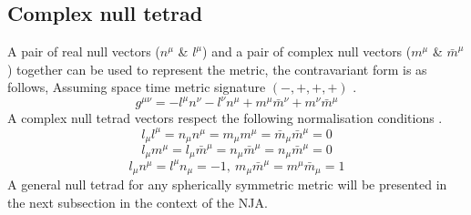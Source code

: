 \documentclass[12pt]{iopart}
\begin{document}
\subsection{Complex null tetrad}
A pair of real null vectors ($n^{\mu}$ \& $l^{\mu}$) and a pair of complex null vectors ($m^{\mu}$ \& $\bar{m}^{\mu}$) together can be used to represent the metric, the contravariant form is as follows, Assuming space time metric signature $(-,+,+,+)$ \cite{dInverno:1992gxs}. 
\begin{equation}
g^{\mu \nu}=-l^{\mu}n^{\nu}-l^{\nu}n^{\mu}+m^{\mu}\bar{m}^{\nu}+m^{\nu}\bar{m}^{\mu}
\end{equation}
A complex null tetrad vectors respect the following normalisation conditions \cite{dInverno:1992gxs}.
\begin{equation} 
l_{\mu}l^{\mu}=n_{\mu}n^{\mu}=m_{\mu}m^{\mu}=\bar{m}_{\mu}\bar{m}^{\mu}=0
\end{equation}
\begin{equation} 
l_{\mu}m^{\mu}=l_{\mu}\bar{m}^{\mu}=n_{\mu}\bar{m}^{\mu}=n_{\mu}\bar{m}^{\mu}=0
\end{equation}
\begin{equation} 
l_{\mu}n^{\mu}=l^{\mu}n_{\mu} =-1,\ m_{\mu}\bar{m}^{\mu}=m^{\mu}\bar{m}_{\mu}=1
\end{equation}
A general null tetrad for any spherically symmetric metric will be presented in the next subsection in the context of the NJA.
\\
\\
\end{document}

